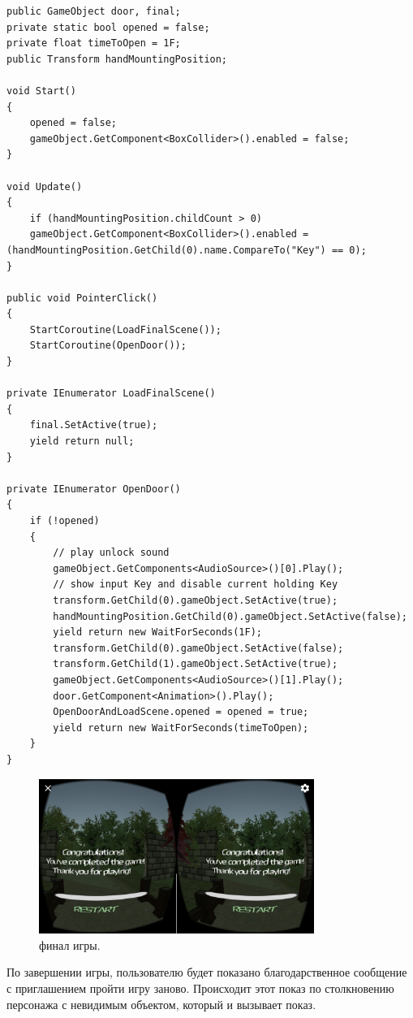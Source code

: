 \begin{small}
    \begin{verbatim}
public GameObject door, final;
private static bool opened = false;
private float timeToOpen = 1F;
public Transform handMountingPosition;

void Start()
{
    opened = false;
    gameObject.GetComponent<BoxCollider>().enabled = false;
}

void Update()
{
    if (handMountingPosition.childCount > 0)
    gameObject.GetComponent<BoxCollider>().enabled = (handMountingPosition.GetChild(0).name.CompareTo("Key") == 0);
}

public void PointerClick()
{
    StartCoroutine(LoadFinalScene());
    StartCoroutine(OpenDoor());
}

private IEnumerator LoadFinalScene()
{
    final.SetActive(true);
    yield return null;
}

private IEnumerator OpenDoor()
{
    if (!opened)
    {
        // play unlock sound
        gameObject.GetComponents<AudioSource>()[0].Play();
        // show input Key and disable current holding Key
        transform.GetChild(0).gameObject.SetActive(true);
        handMountingPosition.GetChild(0).gameObject.SetActive(false);
        yield return new WaitForSeconds(1F);
        transform.GetChild(0).gameObject.SetActive(false);
        transform.GetChild(1).gameObject.SetActive(true);
        gameObject.GetComponents<AudioSource>()[1].Play();
        door.GetComponent<Animation>().Play();
        OpenDoorAndLoadScene.opened = opened = true;
        yield return new WaitForSeconds(timeToOpen);
    }
}

\end{verbatim}
\end{small}

\begin{figure}[h!]
    \centering
    \includegraphics[width=0.8\textwidth]{./screenshots/final.jpg}
    \caption{\small{финал игры.}}
    \label{final}
\end{figure} 

По завершении игры, пользователю будет показано благодарственное сообщение с приглашением пройти игру заново. Происходит этот показ по столкновению персонажа с невидимым объектом, который и вызывает показ.





